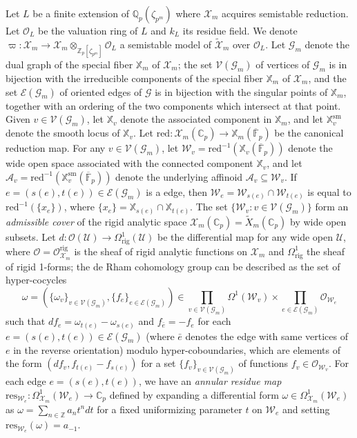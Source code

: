 \documentclass[a4paper,11pt]{amsart}
\numberwithin{equation}{section}
\theoremstyle{plain}
\theoremstyle{definition}
\theoremstyle{remark}
\newcommand{\Q}{\mathbb Q}
\newcommand{\Z}{\mathbb Z}
\newcommand{\C}{\mathbb C}
\newcommand{\F}{\mathbb F}
\newcommand{\rig}{\mathrm{rig}}
\begin{document}
Let $L$ be a finite extension of $\Q_p(\zeta_{p^m})$ where ${\mathcal{X}}_m$ acquires semistable reduction. 
Let $\mathcal{O}_L$ be the valuation ring of $L$ and $k_L$ its residue field. We denote $\varpi\colon\mathscr{X}_m\rightarrow {\mathcal{X}}_m\otimes_{\Z_p[\zeta_{p^m}]}\mathcal{O}_L$ a semistable model of 
$\widetilde{\mathcal{X}}_m$ over $\mathcal{O}_L$. 
Let $\mathcal{G}_m$ denote the dual graph of the special fiber $\mathbb{X}_m$ of $\mathscr{X}_m$; the set $\mathcal{V}(\mathcal{G}_m)$ of vertices of $\mathcal{G}_m$ 
is in bijection with the irreducible components of the special fiber $\mathbb{X}_m$ of $\mathscr{X}_m$, 
and the set $\mathcal{E}(\mathcal{G}_m)$ of oriented edges of $\mathcal{G}$ is in bijection with the singular points of
$\mathbb{X}_m$, together with an ordering of the two components which intersect
at that point. Given $v\in \mathcal{V}(\mathcal{G}_m)$, let $\mathbb{X}_v$ 
denote the associated component in $\mathbb{X}_m$, and let
$\mathbb{X}_v^\mathrm{sm}$ denote the smooth locus of $\mathbb{X}_v$. Let 
$\mathrm{red}\colon\mathscr{X}_m(\C_p)\rightarrow \mathbb{X}_m(\overline{\F}_p)$ be the canonical reduction map. For any $v\in\mathcal{V}(\mathcal{G}_m)$, let $\mathcal{W}_v=\mathrm{red}^{-1}(\mathbb{X}_v(\overline{\F}_p))$ denote the wide open space associated with the connected component $\mathbb{X}_v$, and let $\mathcal{A}_v=\mathrm{red}^{-1}(\mathbb{X}_v^\mathrm{sm}(\overline{\F}_p))$ denote the underlying affinoid $\mathcal{A}_v\subseteq\mathcal{W}_v$. If $e=(s(e),t(e))\in\mathcal{E}(\mathcal{G}_m)$ is a edge, then $\mathcal{W}_e=\mathcal{W}_{s(e)}\cap \mathcal{W}_{t(e)}$ is equal to $\mathrm{red}^{-1}(\{x_e\})$, where $\{x_e\}=\mathbb{X}_{s(e)}\cap\mathbb{X}_{t(e)}$. The set $\{\mathcal{W}_v:v\in\mathcal{V}(\mathcal{G}_m)\}$ form an \emph{admissible cover} of the rigid analytic space $\mathscr{X}_m(\C_p)=\widetilde{X}_m(\C_p)$ by wide open subsets. Let $d\colon\mathcal{O}(\mathcal{U})\rightarrow \Omega^1_{\rig}(\mathcal{U})$ be the differential map for any wide open $\mathcal{U}$, where $\mathcal{O}=\mathcal{O}^\rig_{\mathscr{X}_m}$ is the sheaf of rigid analytic functions on $\mathscr{X}_m$ and $\Omega^1_\rig$ the sheaf of rigid 1-forms; the de Rham cohomology group can be described as the set of hyper-cocycles \[\omega=(\{\omega_v\}_{v\in\mathcal{V}(\mathcal{G}_m)},\{f_e\}_{e\in\mathcal{E}(\mathcal{G}_m)})\in\prod_{v\in\mathcal{V}(\mathcal{G}_m)}\Omega^1(\mathcal{W}_v)\times \prod_{ e\in\mathcal{E}(\mathcal{G}_m)}\mathcal{O}_{\mathcal{W}_e}\] such that $df_e=\omega_{t(e)}-\omega_{s(e)}$ and $f_{\bar{e}}=-f_e$ for each $e=(s(e),t(e))\in\mathcal{E}(\mathcal{G}_m)$ (where $\bar{e}$ denotes the edge with same vertices of $e$ in the reverse orientation) modulo hyper-coboundaries, which are elements of the form $(df_v,f_{t(e)}-f_{s(e)})$ for a set $\{f_v\}_{v\in\mathcal{V}(\mathcal{G}_m)}$ of functions $f_v\in\mathcal{O}_{\mathcal{W}_v}$. For each edge $e=(s(e),t(e))$, we have an \emph{annular residue map} $\mathrm{res}_{\mathcal{W}_e}\colon\Omega^1_{\mathscr{X}_m}(\mathcal{W}_e)\rightarrow\C_p$ defined by expanding a differential form $\omega\in \Omega^1_{\mathscr{X}_m}(\mathcal{W}_e)$ as $\omega=\sum_{n\in\Z}a_nt^n dt$ for a fixed uniformizing parameter $t$ on $\mathcal{W}_e$ and setting $\mathrm{res}_{\mathcal{W}_e}(\omega)=a_{-1}$. 
\end{document}
